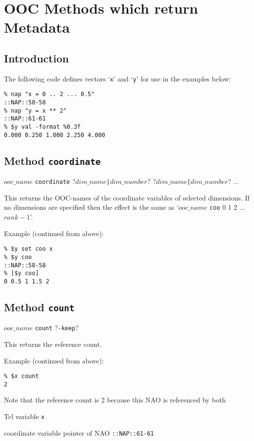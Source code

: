 
\section{OOC Methods which return Metadata}
    \label{ooc-meta}

\subsection{Introduction}
    \label{ooc-meta-intro}

The following code defines vectors `\texttt{x}' and `\texttt{y}' for use in the examples below:
  \begin{verbatim}
% nap "x = 0 .. 2 ... 0.5"
::NAP::58-58
% nap "y = x ** 2"
::NAP::61-61
% $y val -format %0.3f
0.000 0.250 1.000 2.250 4.000
\end{verbatim}

\subsection{Method \texttt{coordinate}}
    \label{ooc-meta-coordinate}

$ooc\_name$ \texttt{coordinate}
?$dim\_name$\texttt{|}$dim\_number$?
?$dim\_name$\texttt{|}$dim\_number$?
$\ldots$

This returns the OOC-names of the coordinate variables of selected
  dimensions. If no dimensions are specified then the effect is the
  same as `$ooc\_name$ \texttt{coo} 0 1 2 $\ldots$ $rank-1$'.

Example (continued from above):
  \begin{verbatim}
% $y set coo x
% $y coo
::NAP::58-58
% [$y coo]
0 0.5 1 1.5 2
\end{verbatim}

\subsection{Method \texttt{count}}
    \label{ooc-meta-count}

$ooc\_name$ \texttt{count} ?\texttt{-keep}?

This returns the reference count.
  

Example (continued from above):
  \begin{verbatim}
% $x count
2
\end{verbatim}

Note that the reference count is 2 because this NAO is referenced
by both
\begin{bullets}
    \item Tcl variable 
    \texttt{x}
    \item coordinate variable pointer of NAO 
    \texttt{::NAP::61-61}
\end{bullets}

